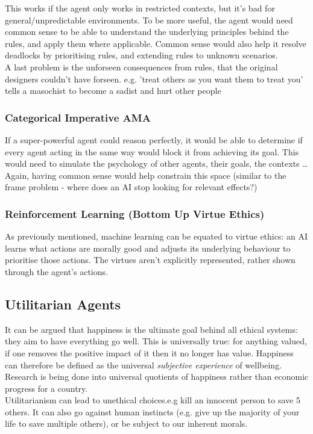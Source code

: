 This works if the agent only works in restricted contexts, but it's bad for general/unpredictable environments. To be more useful, the agent would need common sense to be able to understand the underlying principles behind the rules, and apply them where applicable. Common sense would also help it resolve deadlocks by prioritising rules, and extending rules to unknown scenarios.\\

A last problem is the unforseen consequences from rules, that the original designers couldn't have forseen. e.g. 'treat others as you want them to treat you' tells a masochist to become a sadist and hurt other people

\subsubsection{Categorical Imperative AMA}
If a super-powerful agent could reason perfectly, it would be able to determine if every agent acting in the same way would block it from achieving its goal. This would need to simulate the psychology of other agents, their goals, the contexts \dots \\ Again, having common sense would help constrain this space (similar to the frame problem - where does an AI stop looking for relevant effects?)

\subsubsection{Reinforcement Learning (Bottom Up Virtue Ethics)}
As previously mentioned, machine learning can be equated to virtue ethics: an AI learns what actions are morally good and adjusts its underlying behaviour to prioritise those actions. The virtues aren't explicitly represented, rather shown through the agent's actions. 


\subsection{Utilitarian Agents}
It can be argued that happiness is the ultimate goal behind all ethical systems: they aim to have everything go well. This is universally true: for anything valued, if one removes the positive impact of it then it no longer has value. Happiness can therefore be defined as the universal \emph{subjective experience} of wellbeing.\\
Research is being done into universal quotients of happiness rather than economic progress for a country. \\
Utilitarianism can lead to unethical choices.e.g kill an innocent person to save 5 others. It can also go against human instincts (e.g. give up the majority of your life to save multiple others), or be subject to our inherent morals. \\ 


